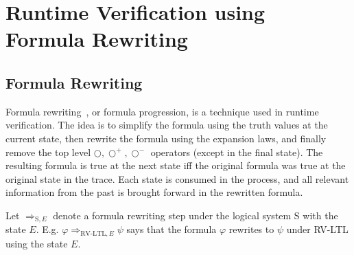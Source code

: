 \documentclass[a4paper]{article}
\newcommand{\tiff}{\text{ iff }}
\newcommand{\sn}{\bigcirc^+}
\newcommand{\wn}{\bigcirc^-}
\newcommand{\rw}[1]{\Rightarrow_{#1}}
\begin{document}




\section{Runtime Verification using Formula Rewriting}
\subsection{Formula Rewriting}
Formula rewriting~\autocite{rosu2005rewriting}, or formula progression, is a technique used in runtime verification.
The idea is to simplify the formula using the truth values at the current state, then rewrite the formula using the expansion laws, and finally remove the top level $\bigcirc,\sn,\wn$ operators (except in the final state). The resulting formula is true at the next state iff the original formula was true at the original state in the trace.
Each state is consumed in the process, and all relevant information from the past is brought forward in the rewritten formula.

\begin{notn}[Rewrites]

  Let $\rw{\text{S},E}$ denote a formula rewriting step under the logical system S with the state $E$. E.g. $\varphi\rw{\text{RV-LTL},E}\psi$ says that the formula $\varphi$ rewrites to $\psi$ under RV-LTL using the state $E$.
\end{notn}
\end{document}
